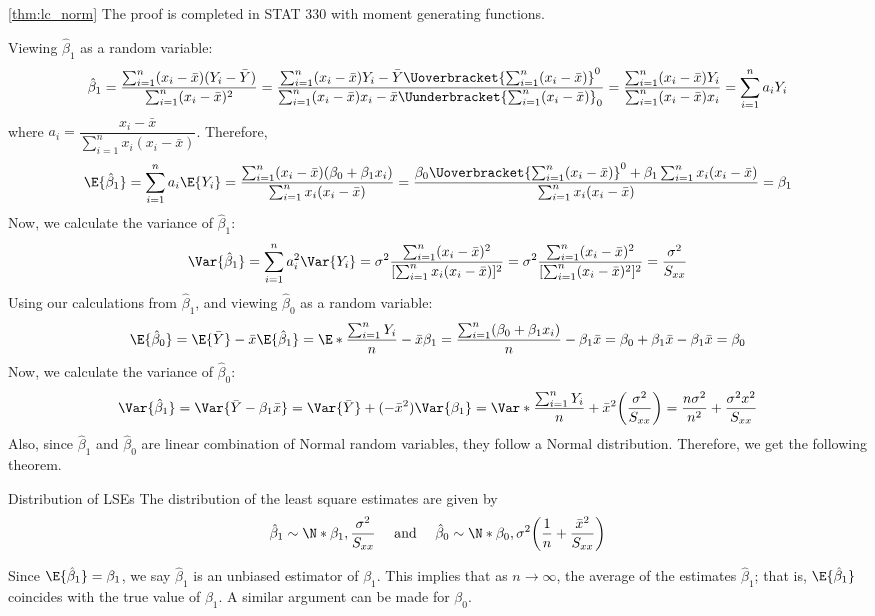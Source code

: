 \begin{Proof}{\ref{thm:lc_norm}}{}
    The proof is completed in STAT 330 with moment generating functions.
\end{Proof}
Viewing $ \hat{\beta}_1 $ as a random variable:
\[ \hat{\beta}_1=\frac{\sum_{i=1}^{n} (x_i-\bar{x})
        (Y_i-\bar{Y})}{
        \sum_{i=1}^{n} (x_i-\bar{x})^2
    }
    =
    \frac{\sum_{i=1}^{n} (x_i-\bar{x})Y_i-
        \bar{Y}\Uoverbracket{\sum_{i=1}^{n} (x_i-\bar{x})}^{0}}{
        \sum_{i=1}^{n} (x_i-\bar{x})x_i-\bar{x}
        \Uunderbracket{\sum_{i=1}^{n} (x_i-\bar{x})}_{0}
    }
    =
    \frac{\sum_{i=1}^{n} (x_i-\bar{x})Y_i}{
        \sum_{i=1}^{n} (x_i-\bar{x})x_i
    }=\sum_{i=1}^{n} a_i Y_i  \]
where $ a_i=\dfrac{x_i-\bar{x}}{\sum_{i=1}^{n} x_i(x_i-\bar{x})}  $.
Therefore,
\[
    \E{\hat{\beta}_1}
    = \sum_{i=1}^{n} a_i\E{Y_i}
    =\frac{\sum_{i=1}^{n}(x_i-\bar{x})(\beta_0+\beta_1x_i)}{
        \sum_{i=1}^{n} x_i(x_i-\bar{x})
    }
    =\frac{\beta_0 \Uoverbracket{\sum_{i=1}^{n}(x_i-\bar{x})}^{0}+
        \beta_1\sum_{i=1}^{n} x_i(x_i-\bar{x})}{
        \sum_{i=1}^{n} x_i(x_i-\bar{x})
    }
    =
    \beta_1
\]
Now, we calculate the variance of $ \hat{\beta}_1 $:
\[
    \Var{\hat{\beta}_1}
    =\sum_{i=1}^{n} a_i^2\Var{Y_i}
    =\sigma^2
    \frac{\sum_{i=1}^{n} (x_i-\bar{x})^2}{
        [\sum_{i=1}^{n} x_i(x_i-\bar{x})]^2
    }
    =\sigma^2 \frac{\sum_{i=1}^{n} (x_i-\bar{x})^2}{
        [\sum_{i=1}^{n} (x_i-\bar{x})^2]^2
    }
    =\frac{\sigma^2}{S_{xx}}
\]
Using our calculations from $ \hat{\beta}_1 $,
and viewing $ \hat{\beta}_0 $ as a random variable:
\[ \E{\hat{\beta}_0}=
    \E{\bar{Y}}-\bar{x}\E{\hat{\beta}_1}=
    \E*{\frac{\sum_{i=1}^{n}Y_i}{n}}-\bar{x}\beta_1=
    \frac{\sum_{i=1}^{n}(\beta_0+\beta_1x_i)}{n}-
    \beta_1\bar{x}=\beta_0+\beta_1\bar{x}-\beta_1\bar{x}=\beta_0
\]
Now, we calculate the variance of $ \hat{\beta}_0 $:
\[
    \Var{\hat{\beta}_1}
    =\Var{\bar{Y}-\beta_1\bar{x}}
    =\Var{\bar{Y}}+(-\bar{x}^2)\Var{\beta_1}
    =\Var*{\frac{\sum_{i=1}^{n} Y_i}{n}}+\bar{x}^2\biggl( \frac{\sigma^2}{S_{xx}} \biggr)
    =\frac{n\sigma^2}{n^2}+\frac{\sigma^2 x^2}{S_{xx}}
\]
Also, since $ \hat{\beta}_1 $ and $ \hat{\beta}_0 $
are linear combination of Normal random variables,
they follow a Normal distribution. Therefore, we get the following theorem.
\begin{Theorem}{Distribution of LSEs}{}
    The distribution of the least square estimates are given by
    \[ \hat{\beta}_1\sim
        \N*{\beta_1,\frac{\sigma^2}{S_{xx}}}\quad\text{ and }\quad
        \hat{\beta}_0
        \sim \N*{\beta_0,\sigma^2
            \biggl(\frac{1}{n}+\frac{\bar{x}^2}{S_{xx}}\biggr)} \]
\end{Theorem}
Since $ \E{\hat{\beta}_1}=\beta_1 $,
we say $ \hat{\beta}_1 $ is an unbiased
estimator of $ \beta_1 $. This implies
that as $ n\to\infty $, the average
of the estimates $ \hat{\beta}_1 $; that is,
$ \E{\hat{\beta}_1} $ coincides with the true
value of $ \beta_1 $. A similar argument can be made for $ \beta_0 $.

